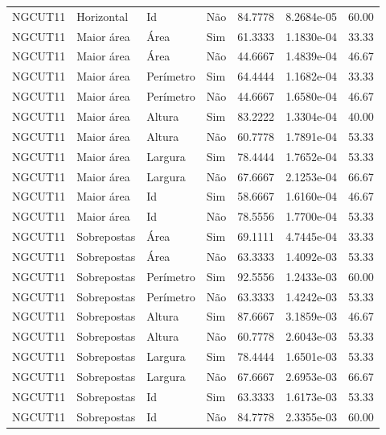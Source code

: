 \begin{tabular}{llllrrr}
NGCUT11   & Horizontal  & Id        & Não         & 84.7778      & 8.2684e-05 & 60.00    \\
NGCUT11   & Maior área  & Área      & Sim         & 61.3333      & 1.1830e-04 & 33.33    \\
NGCUT11   & Maior área  & Área      & Não         & 44.6667      & 1.4839e-04 & 46.67    \\
NGCUT11   & Maior área  & Perímetro & Sim         & 64.4444      & 1.1682e-04 & 33.33    \\
NGCUT11   & Maior área  & Perímetro & Não         & 44.6667      & 1.6580e-04 & 46.67    \\
NGCUT11   & Maior área  & Altura    & Sim         & 83.2222      & 1.3304e-04 & 40.00    \\
NGCUT11   & Maior área  & Altura    & Não         & 60.7778      & 1.7891e-04 & 53.33    \\
NGCUT11   & Maior área  & Largura   & Sim         & 78.4444      & 1.7652e-04 & 53.33    \\
NGCUT11   & Maior área  & Largura   & Não         & 67.6667      & 2.1253e-04 & 66.67    \\
NGCUT11   & Maior área  & Id        & Sim         & 58.6667      & 1.6160e-04 & 46.67    \\
NGCUT11   & Maior área  & Id        & Não         & 78.5556      & 1.7700e-04 & 53.33    \\
NGCUT11   & Sobrepostas & Área      & Sim         & 69.1111      & 4.7445e-04 & 33.33    \\
NGCUT11   & Sobrepostas & Área      & Não         & 63.3333      & 1.4092e-03 & 53.33    \\
NGCUT11   & Sobrepostas & Perímetro & Sim         & 92.5556      & 1.2433e-03 & 60.00    \\
NGCUT11   & Sobrepostas & Perímetro & Não         & 63.3333      & 1.4242e-03 & 53.33    \\
NGCUT11   & Sobrepostas & Altura    & Sim         & 87.6667      & 3.1859e-03 & 46.67    \\
NGCUT11   & Sobrepostas & Altura    & Não         & 60.7778      & 2.6043e-03 & 53.33    \\
NGCUT11   & Sobrepostas & Largura   & Sim         & 78.4444      & 1.6501e-03 & 53.33    \\
NGCUT11   & Sobrepostas & Largura   & Não         & 67.6667      & 2.6953e-03 & 66.67    \\
NGCUT11   & Sobrepostas & Id        & Sim         & 63.3333      & 1.6173e-03 & 53.33    \\
NGCUT11   & Sobrepostas & Id        & Não         & 84.7778      & 2.3355e-03 & 60.00    \\
\hline
\end{tabular}